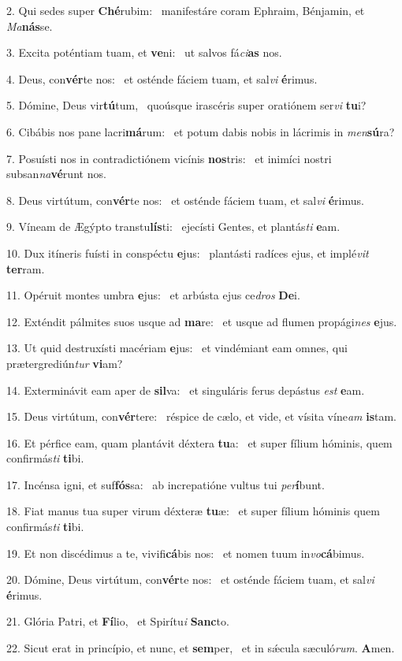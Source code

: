 2. Qui sedes super \textbf{Ché}rubim: \ast\  manifestáre coram Ephraim, Bénjamin, et \textit{Ma}\textbf{nás}se.\

3. Excita poténtiam tuam, et \textbf{ve}ni: \ast\  ut salvos fá\textit{ci}\textbf{as} nos.\

4. Deus, con\textbf{vér}te nos: \ast\  et osténde fáciem tuam, et sal\textit{vi} \textbf{é}rimus.\

5. Dómine, Deus vir\textbf{tú}tum, \ast\  quoúsque irascéris super oratiónem ser\textit{vi} \textbf{tu}i?\

6. Cibábis nos pane lacri\textbf{má}rum: \ast\  et potum dabis nobis in lácrimis in \textit{men}\textbf{sú}ra?\

7. Posuísti nos in contradictiónem vicínis \textbf{nos}tris: \ast\  et inimíci nostri subsan\textit{na}\textbf{vé}runt nos.\

8. Deus virtútum, con\textbf{vér}te nos: \ast\  et osténde fáciem tuam, et sal\textit{vi} \textbf{é}rimus.\

9. Víneam de Ægýpto transtu\textbf{lís}ti: \ast\  ejecísti Gentes, et plantás\textit{ti} \textbf{e}am.\

10. Dux itíneris fuísti in conspéctu \textbf{e}jus: \ast\  plantásti radíces ejus, et implé\textit{vit} \textbf{ter}ram.\

11. Opéruit montes umbra \textbf{e}jus: \ast\  et arbústa ejus ce\textit{dros} \textbf{De}i.\

12. Exténdit pálmites suos usque ad \textbf{ma}re: \ast\  et usque ad flumen propági\textit{nes} \textbf{e}jus.\

13. Ut quid destruxísti macériam \textbf{e}jus: \ast\  et vindémiant eam omnes, qui prætergrediún\textit{tur} \textbf{vi}am?\

14. Exterminávit eam aper de \textbf{sil}va: \ast\  et singuláris ferus depástus \textit{est} \textbf{e}am.\

15. Deus virtútum, con\textbf{vér}tere: \ast\  réspice de cælo, et vide, et vísita víne\textit{am} \textbf{is}tam.\

16. Et pérfice eam, quam plantávit déxtera \textbf{tu}a: \ast\  et super fílium hóminis, quem confirmás\textit{ti} \textbf{ti}bi.\

17. Incénsa igni, et suf\textbf{fós}sa: \ast\  ab increpatióne vultus tui \textit{per}\textbf{í}bunt.\

18. Fiat manus tua super virum déxteræ \textbf{tu}æ: \ast\  et super fílium hóminis quem confirmás\textit{ti} \textbf{ti}bi.\

19. Et non discédimus a te, vivifi\textbf{cá}bis nos: \ast\  et nomen tuum in\textit{vo}\textbf{cá}bimus.\

20. Dómine, Deus virtútum, con\textbf{vér}te nos: \ast\  et osténde fáciem tuam, et sal\textit{vi} \textbf{é}rimus.\

21. Glória Patri, et \textbf{Fí}lio, \ast\  et Spirítu\textit{i} \textbf{Sanc}to.\

22. Sicut erat in princípio, et nunc, et \textbf{sem}per, \ast\  et in sǽcula sæculó\textit{rum}. \textbf{A}men.\

